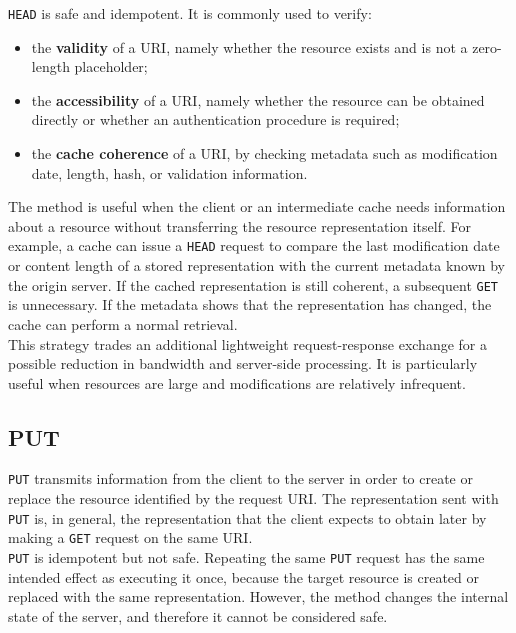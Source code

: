 \documentclass{scrbook}
\begin{document}
\texttt{HEAD} is safe and idempotent. It is commonly used to verify:
\begin{itemize}
    \item the \textbf{validity} of a URI, namely whether the resource exists and is not a zero-length placeholder;
    \item the \textbf{accessibility} of a URI, namely whether the resource can be obtained directly or whether an authentication procedure is required;
    \item the \textbf{cache coherence} of a URI, by checking metadata such as modification date, length, hash, or validation information.
\end{itemize}

The method is useful when the client or an intermediate cache needs information about a resource without transferring the resource representation itself. For example, a cache can issue a \texttt{HEAD} request to compare the last modification date or content length of a stored representation with the current metadata known by the origin server. If the cached representation is still coherent, a subsequent \texttt{GET} is unnecessary. If the metadata shows that the representation has changed, the cache can perform a normal retrieval.\\

This strategy trades an additional lightweight request-response exchange for a possible reduction in bandwidth and server-side processing. It is particularly useful when resources are large and modifications are relatively infrequent.

\subsection{PUT}

\texttt{PUT} transmits information from the client to the server in order to create or replace the resource identified by the request URI. The representation sent with \texttt{PUT} is, in general, the representation that the client expects to obtain later by making a \texttt{GET} request on the same URI.\\

\texttt{PUT} is idempotent but not safe. Repeating the same \texttt{PUT} request has the same intended effect as executing it once, because the target resource is created or replaced with the same representation. However, the method changes the internal state of the server, and therefore it cannot be considered safe.\\
\end{document}

